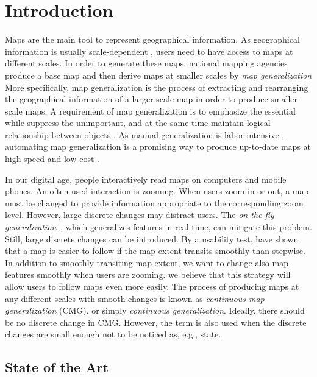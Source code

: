 \chapter{Introduction}
\label{chap:introduction}


Maps are the main tool to represent geographical information. 
As geographical information is usually scale-dependent
\parencite{Muller1995Generalization,Weibel1997}, 
users need to have access to maps at different scales.
In order to generate these maps,
national mapping agencies produce a base map
and then derive maps at smaller scales by 
\emph{map generalization}
More specifically, map generalization is 
the process of extracting and rearranging 
the geographical information of a larger-scale map 
in order to produce smaller-scale maps.
A requirement of map generalization is to emphasize the 
essential while suppress the unimportant,
and at the same time maintain logical relationship between 
objects \parencite{Weibel1997}.
As manual generalization is labor-intensive
\parencite{Duchene2014},
automating map generalization is a promising way 
to produce up-to-date maps at high speed and low cost 
\parencite{Mackaness2017Generalization}.


In our digital age, people interactively read maps 
on computers and mobile phones.
An often used interaction is zooming. 
When users zoom in or out, 
a map must be changed to provide information 
appropriate to the corresponding zoom level.
However, large discrete changes may distract users.
The \emph{on-the-fly generalization}~\parencite{Weibel2017Fly},
which generalizes features in real time, can mitigate this problem.
Still, large discrete changes can be introduced.
By a usability test, \textcite{Midtbo2007} have shown that 
a map is easier to follow 
if the map extent transits smoothly than stepwise. 
In addition to smoothly transiting map extent, 
we want to change also map features smoothly 
when users are zooming.
we believe that this strategy will allow users 
to follow maps even more easily.
The process of producing maps at any different scales
with smooth changes 
is known as \emph{continuous map generalization} (CMG), 
or simply \emph{continuous generalization}.
Ideally, there should be no discrete change in CMG.
However, the term is also used when 
the discrete changes are small enough not to be noticed as,
e.g., \textcite{Suba2016Road} state.



\section{State of the Art}
\label{sec:Intro_State}



